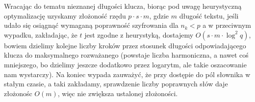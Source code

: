 \documentclass[a4paper]{article}
\theoremstyle{defn}
\theoremstyle{theorem}
\theoremstyle{lemma}
\theoremstyle{cor}
\theoremstyle{fact}
\begin{document}
Wracając do tematu nieznanej długości klucza,  biorąc pod uwagę heurystyczną optymalizację uzyskamy złożoność rzędu $p \cdot s \cdot m $, gdzie $m$ długość tekstu, jeśli udało się osiągnąć wymaganą poprawność szyfrowania dla $n_k<p$ a w przeciwnym wypadku, zakładając, że $t$ jest zgodne z heurystyką, dostajemy $O(s \cdot m \cdot \log^2 q)$, bowiem dzielimy kolejne liczby kroków przez stosunek długości odpowiadającego klucza do maksymalnego rozważanego (powstaje liczba harmoniczna, a nawet coś mniejszego, bo dzielimy jeszcze dodatkowo przez logarytm, ale takie oszacowanie nam wystarczy). Na koniec wypada zauważyć, że przy dostępie do pól słownika w stałym czasie, a taki zakładamy, sprawdzenie liczby poprawnych słów daje złożonośc $O(m)$, więc nie zwiększa ustalonej złożoności.\\\\
\end{document}
